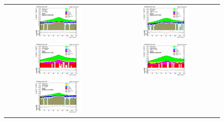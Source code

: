 \begin{figure}[htp]
  \begin{center}
    \begin{tabular}{cc}
      \includegraphics[width=0.45\textwidth]{figures/Zprime/2016/ScaleFactor/SameSign/nominal/stack_mee_Barrel_probes_PUW.png} &
      \includegraphics[width=0.45\textwidth]{figures/Zprime/2016/ScaleFactor/SameSign/nominal/stack_mee_Endcap_probes_PUW.png} \\
      \includegraphics[width=0.45\textwidth]{figures/Zprime/2016/ScaleFactor/SameSign/nominal/stack_mee_Barrel_pass_PUW.png} &
      \includegraphics[width=0.45\textwidth]{figures/Zprime/2016/ScaleFactor/SameSign/nominal/stack_mee_Endcap_pass_PUW.png}\\
      \includegraphics[width=0.45\textwidth]{figures/Zprime/2016/ScaleFactor/SameSign/nominal/stack_mee_Barrel_fail_PUW.png} &

\end{tabular}
\end{center}
\end{figure}
